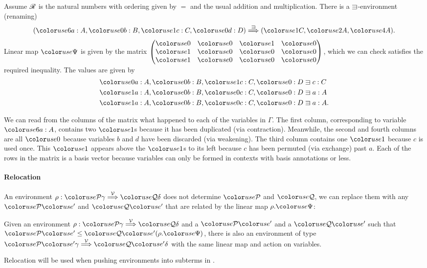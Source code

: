 \begin{example}
  Assume $\mathscr R$ is the natural numbers with ordering given by $=$ and the usual
  addition and multiplication.
  There is a $\sqni$-environment (renaming)
  \[
    \plr{\gr6a : A, \gr0b : B, \gr1c : C, \gr0d : D} \env\sqni
    \plr{\gr1C, \gr2A, \gr4A}.
  \]
  Linear map $\gr\Psi$ is given by the matrix
  \(
    \begin{pmatrix}
      \gr0 & \gr0 & \gr1 & \gr0 \\
      \gr1 & \gr0 & \gr0 & \gr0 \\
      \gr1 & \gr0 & \gr0 & \gr0
    \end{pmatrix}
  \),
  which we can check satisfies the required inequality.
  The values are given by
  \begin{align*}
    \gr0a : A, \gr0b : B, \gr1c : C, \gr0 : D &\sqni c : C \\
    \gr1a : A, \gr0b : B, \gr0c : C, \gr0 : D &\sqni a : A \\
    \gr1a : A, \gr0b : B, \gr0c : C, \gr0 : D &\sqni a : A.
  \end{align*}

  We can read from the columns of the matrix what happened to each of the
  variables in $\Gamma$.
  The first column, corresponding to variable $\gr6a : A$, contains two $\gr1$s
  because it has been duplicated (via contraction).
  Meanwhile, the second and fourth columns are all $\gr0$ because variables
  $b$ and $d$ have been discarded (via weakening).
  The third column contains one $\gr1$ because $c$ is used once.
  This $\gr1$ appears above the $\gr1$s to its left because $c$ has been
  permuted (via exchange) past $a$.
  Each of the rows in the matrix is a basis vector because variables can only
  be formed in contexts with basis annotations or less.
\end{example}

\paragraph{Relocation} An environment
$\rho : \grP\gamma \env\V \grQ\delta$ does not determine $\grP$ and
$\grQ$, we can replace them with any $\grPprime$ and $\grQprime$ that
are related by the linear map $\rho.\gr\Psi$:

\begin{lemma}\label{thm:env-resize}
  Given an environment $\rho : \grP\gamma \env\V \grQ\delta$ and a $\grPprime$
  and a $\grQprime$ such that $\grPprime \leq \grQprime\plr{\rho.\gr\Psi}$,
  there is also an environment of type $\grPprime\gamma \env\V \grQprime\delta$
  with the same linear map and action on variables.
\end{lemma}
Relocation will be used when pushing environments into subterms in
.


